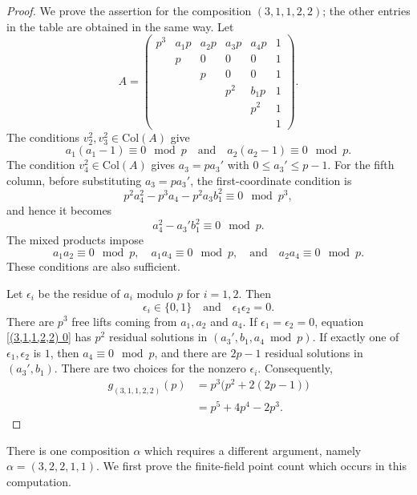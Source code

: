 \documentclass[a4paper]{amsart}
\numberwithin{equation}{section}
\theoremstyle{remark}
\renewcommand{\Col}{\mathrm{Col}}
\begin{document}
\begin{proof}
We prove the assertion for the composition $(3,1,1,2,2)$; the other entries in the table are obtained in the same way. Let
\[A=\begin{pmatrix}
p^3&a_1p&a_2p&a_3p&a_4p&1\\
&p&0&0&0&1\\
&&p&0&0&1\\
&&&p^2&b_1p&1\\
&&&&p^2&1\\
&&&&&1
\end{pmatrix}.\]
The conditions $v_2^2,v_3^2\in\Col(A)$ give
\[a_1(a_1-1)\equiv0\mod p\quad\text{and}\quad a_2(a_2-1)\equiv0\mod p.\]
The condition $v_4^2\in\Col(A)$ gives $a_3=pa_3'$ with $0\leq a_3'\leq p-1$. For the fifth column, before substituting $a_3=pa_3'$, the first-coordinate condition is
\[p^2a_4^2-p^3a_4-p^2a_3b_1^2\equiv0\mod p^3,\]
and hence it becomes
\begin{equation}\label{(3,1,1,2,2) 0}
a_4^2-a_3'b_1^2\equiv0\mod p.
\end{equation}
The mixed products impose
\[a_1a_2\equiv0\mod p,\quad a_1a_4\equiv0\mod p,\quad\text{and}\quad a_2a_4\equiv0\mod p.\]
These conditions are also sufficient.

Let $\epsilon_i$ be the residue of $a_i$ modulo $p$ for $i=1,2$. Then
\[\epsilon_i\in\{0,1\}\quad\text{and}\quad \epsilon_1\epsilon_2=0.\]
There are $p^3$ free lifts coming from $a_1,a_2$ and $a_4$. If $\epsilon_1=\epsilon_2=0$, equation \eqref{(3,1,1,2,2) 0} has $p^2$ residual solutions in $(a_3',b_1,a_4\bmod p)$. If exactly one of $\epsilon_1,\epsilon_2$ is $1$, then $a_4\equiv0\mod p$, and there are $2p-1$ residual solutions in $(a_3',b_1)$. There are two choices for the nonzero $\epsilon_i$. Consequently,
\begin{align*}
g_{(3,1,1,2,2)}(p)
&=p^3\bigl(p^2+2(2p-1)\bigr)\\
&=p^5+4p^4-2p^3.
\end{align*}
\end{proof}

\par There is one composition $\alpha$ which requires a different argument, namely $\alpha=(3,2,2,1,1)$. We first prove the finite-field point count which occurs in this computation.
\end{document}
